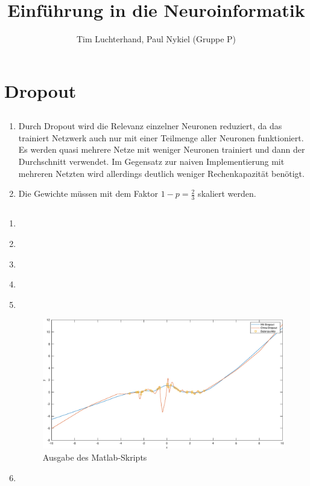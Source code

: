 \documentclass[DIN, pagenumber=false, fontsize=11pt, parskip=half]{scrartcl}
\title{Einführung in die Neuroinformatik}
\author{Tim Luchterhand, Paul Nykiel (Gruppe P)}
\begin{document}
    \maketitle
    \section{Dropout}
    \subsection{}
    \begin{enumerate}[label=\alph*)]
        \item Durch Dropout wird die Relevanz einzelner Neuronen reduziert, da das trainiert Netzwerk auch nur mit einer Teilmenge aller Neuronen
            funktioniert. Es werden quasi mehrere Netze mit weniger Neuronen trainiert und dann der Durchschnitt verwendet. Im Gegensatz zur naiven Implementierung
            mit mehreren Netzten wird allerdings deutlich weniger Rechenkapazität benötigt.
        \item Die Gewichte müssen mit dem Faktor $1 - p = \frac{2}{3}$ skaliert werden.
    \end{enumerate}

    \subsection{}
    \begin{enumerate}[label=\alph*)]
        \item $ $ 
        \item $ $ 
        \item $ $ 
        \item $ $ 
        \item $ $ 
            \begin{figure}[H]
                \centering
                \includegraphics[width=\textwidth]{b10a01.eps}
                \caption{Ausgabe des Matlab-Skripts}
            \end{figure}
        \item $ $ 
    \end{enumerate}
\end{document}
